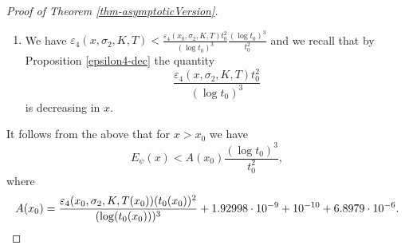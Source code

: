 \documentclass[10pt]{amsart}
\theoremstyle{definition}
\numberwithin{equation}{section}
\begin{document}
\begin{proof}[Proof of Theorem \ref{thm-asymptoticVersion}]
\begin{enumerate}
\item We have $  \varepsilon_4(x,\sigma_2,K,T)   <   \frac{  \varepsilon_4(x_0,\sigma_2,K,T) t_0^2}{(\log t_0)^3}    \frac{(\log t_0)^3}{t_0^2} $
and we recall that by Proposition \ref{epsilon4-dec} the quantity
\[   \frac{  \varepsilon_4(x,\sigma_2,K,T) t_0^2}{(\log t_0)^3}  \]
is decreasing in $x$.
\end{enumerate}
It follows from the above that for $x>x_0$ we have
\[   E_{\psi}(x)  <    A(x_0) \frac{(\log t_0)^3}{t_0^2} ,\]
where 
\begin{equation} \label{def-Ax} A(x_0) =  \frac{  \varepsilon_4(x_0,\sigma_2,K,T(x_0)) (t_0(x_0))^2}{(\log (t_0(x_0)))^3}  + 1.92998\cdot 10^{-9} + 10^{-10} +  6.8979 \cdot 10^{-6}. \qedhere\end{equation}
\end{proof}
\end{document}
